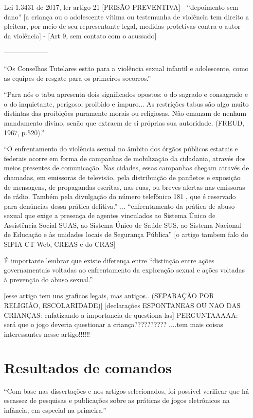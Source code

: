 Lei 1.3431 de 2017, ler artigo 21 [PRISÃO PREVENTIVA] - “depoimento sem dano” [a criança ou o adolescente vítima ou testemunha de violência tem direito a pleitear, por meio de seu representante legal, medidas protetivas contra o autor da violência] - [Art 9, sem contato com o acussado] \cite{planalto13431}

-------------------- 


``Os Conselhos Tutelares estão para a violência sexual infantil e adolescente, como as equipes de resgate para os primeiros socorros.'' \cite{caccia2014conselheiros}

``Para nós o tabu apresenta dois significados opostos: o do sagrado e consagrado e o do inquietante, perigoso, proibido e impuro... As restrições tabus são algo muito distintas das proibições puramente morais ou religiosas. Não emanam de nenhum mandamento divino, senão que extraem de si próprias sua autoridade. (FREUD, 1967, p.520).''

``O enfrentamento do violência sexual no âmbito dos órgãos públicos estatais e federais ocorre em forma de campanhas de mobilização da cidadania, através dos meios presentes de comunicação. Nas cidades, essas campanhas chegam através de chamadas, em emissoras de televisão, pela distribuição de panfletos e exposição de mensagens, de propagandas escritas, nas ruas, ou breves alertas nas emissoras de rádio. Também pela divulgação do número telefônico 181 , que é reservado para denúncias dessa prática delitiva.'' ... ``enfrentamento da prática de abuso sexual que exige a presença de agentes vinculados ao Sistema Único de Assistência Social-SUAS, ao Sistema Único de Saúde-SUS, ao Sistema Nacional de Educação e às unidades locais de Segurança Pública'' [o artigo tambem falo do SIPIA-CT Web, CREAS e do CRAS] \cite{caccia2014conselheiros}

É importante lembrar que existe diferença entre ``distinção entre ações governamentais voltadas ao enfrentamento da exploração sexual e ações voltadas à prevenção do abuso sexual.''  \cite{caccia2014conselheiros}



[esse artigo tem uns graficos legais, mas antigos.. (SEPARAÇÃO POR RELIGIÃO, ESCOLARIDADE)] [declarações ESPONTANEAS OU NAO DAS CRIANÇAS: enfatizando a importancia de questiona-las] PERGUNTAAAAA: será que o jogo deveria questionar a criança?????????? \cite{cardoso2016abuso} ....tem mais coisas interessantes nesse artigo!!!!!!



\chapter{Resultados de comandos}\label{cap_exemplos}

``Com base nas dissertações e nos artigos selecionados, foi possível verificar que há escassez de pesquisas e publicações sobre as práticas de jogos eletrônicos na infância, em especial na primeira.''  \cite{cotonhoto2016pratica}
